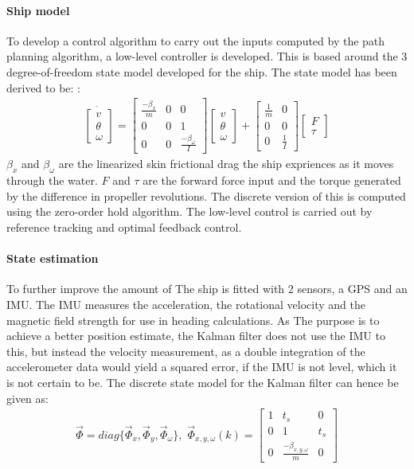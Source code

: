 \documentclass[a0,portrait]{a0poster}
\begin{document}
\begin{center}
{\paragraph{Ship model}
To develop a control algorithm to carry out the inputs computed by the path planning algorithm, a low-level controller is developed. This is based around the 3 degree-of-freedom state model developed for the ship. The state model has been derived to be: \cite{sorensen}:
\begin{align}
\dot{\begin{bmatrix}
v\\
\theta\\
\omega
\end{bmatrix}} = \begin{bmatrix}
\frac{-\beta_x}{m} & 0 & 0\\
0 & 0 & 1\\
0 & 0 & \frac{-\beta_\omega}{I}
\end{bmatrix}\begin{bmatrix}
v\\
\theta\\
\omega
\end{bmatrix} + \begin{bmatrix}
\frac{1}{m} & 0\\
0 & 0\\
0 & \frac{1}{I}
\end{bmatrix}\begin{bmatrix}
F\\
\tau
\end{bmatrix}
\end{align}
$\beta_x$ and $\beta_\omega$ are the linearized skin frictional drag the ship expriences as it moves through the water. $F$ and $\tau$ are the forward force input and the torque generated by the difference in propeller revolutions. The discrete version of this is computed using the zero-order hold algorithm. The low-level control is carried out by reference tracking and optimal feedback control. 

\paragraph{State estimation}
To further improve the amount of 
The ship is fitted with 2 sensors, a GPS and an IMU. The IMU measures the acceleration, the rotational velocity and the magnetic field strength for use in heading calculations. As The purpose is to achieve a better position estimate, the Kalman filter does not use the IMU to this, but instead the velocity measurement, as a double integration of the accelerometer data would yield a squared error, if the IMU is not level, which it is not certain to be. The discrete state model for the Kalman filter can hence be given as:
\begin{align}
\vec{\Phi} = diag\{\vec{\Phi} _x,\vec{\Phi} _y,\vec{\Phi} _\omega\},\,\, \vec{\Phi}_{x,y,\omega}(k) = \begin{bmatrix}
1 & t_s & 0\\
0 & 1 & t_s\\
0 & \frac{-\beta_{x,y,\omega}}{m} & 0
\end{bmatrix}
\end{align}

}
\end{center}
\end{document}
